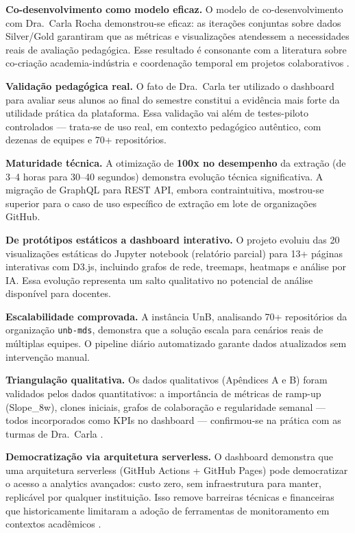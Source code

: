 \documentclass[
	12pt,
	openright,
	oneside,
	a4paper,
	brazil
]{abntex2}
\begin{document}
\textbf{Co-desenvolvimento como modelo eficaz.} O modelo de co-desenvolvimento com Dra.\ Carla Rocha demonstrou-se eficaz: as iterações conjuntas sobre dados Silver/Gold garantiram que as métricas e visualizações atendessem a necessidades reais de avaliação pedagógica. Esse resultado é consonante com a literatura sobre co-criação academia-indústria \cite{bjerregaard2021lessons} e coordenação temporal em projetos colaborativos \cite{franssen2019cogs}.

\textbf{Validação pedagógica real.} O fato de Dra.\ Carla ter utilizado o dashboard para avaliar seus alunos ao final do semestre constitui a evidência mais forte da utilidade prática da plataforma. Essa validação vai além de testes-piloto controlados --- trata-se de uso real, em contexto pedagógico autêntico, com dezenas de equipes e 70+ repositórios.

\textbf{Maturidade técnica.} A otimização de \textbf{100x no desempenho} da extração (de 3--4 horas para 30--40 segundos) demonstra evolução técnica significativa. A migração de GraphQL para REST API, embora contraintuitiva, mostrou-se superior para o caso de uso específico de extração em lote de organizações GitHub.

\textbf{De protótipos estáticos a dashboard interativo.} O projeto evoluiu das 20 visualizações estáticas do Jupyter notebook (relatório parcial) para 13+ páginas interativas com D3.js, incluindo grafos de rede, treemaps, heatmaps e análise por IA. Essa evolução representa um salto qualitativo no potencial de análise disponível para docentes.

\textbf{Escalabilidade comprovada.} A instância UnB, analisando 70+ repositórios da organização \texttt{unb-mds}, demonstra que a solução escala para cenários reais de múltiplas equipes. O pipeline diário automatizado garante dados atualizados sem intervenção manual.

\textbf{Triangulação qualitativa.} Os dados qualitativos (Apêndices A e B) foram validados pelos dados quantitativos: a importância de métricas de ramp-up (Slope\_8w), clones iniciais, grafos de colaboração e regularidade semanal --- todos incorporados como KPIs no dashboard --- confirmou-se na prática com as turmas de Dra.\ Carla \cite{hamer2021using,kitchenham2010s}.

\textbf{Democratização via arquitetura serverless.} O dashboard demonstra que uma arquitetura serverless (GitHub Actions + GitHub Pages) pode democratizar o acesso a analytics avançados: custo zero, sem infraestrutura para manter, replicável por qualquer instituição. Isso remove barreiras técnicas e financeiras que historicamente limitaram a adoção de ferramentas de monitoramento em contextos acadêmicos \cite{vega2022scrumwatch,ozkan2019agile}.
\end{document}
